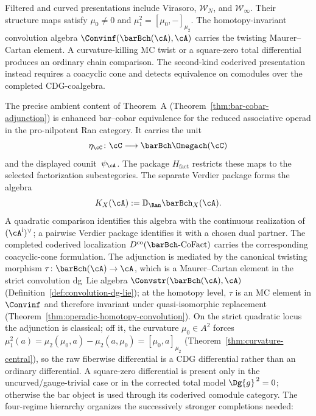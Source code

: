 Filtered and curved presentations include Virasoro,
\(\mathcal W_N\), and \(\mathcal W_\infty\).  Their structure maps
satisfy
\(\mu_0\neq0\) and
\(\mu_1^2=[\mu_0,-]_{\mu_2}\).
The homotopy-invariant convolution algebra
\(\Convinf(\barBch(\cA),\cA)\) carries the twisting
Maurer--Cartan element.  A curvature-killing MC twist or a
square-zero total differential produces an ordinary chain
comparison.  The second-kind coderived presentation instead
requires a coacyclic cone and detects equivalence on comodules over
the completed CDG-coalgebra.

The precise ambient content of Theorem~A
(Theorem~\ref{thm:bar-cobar-adjunction}) is enhanced bar--cobar
equivalence for the reduced associative operad in the pro-nilpotent
Ran category.  It carries the unit
\[
 \eta_\cC\colon\cC\longrightarrow\barBch\Omegach(\cC)
\]
and the displayed counit~\(\psi_\cA\).  The package
\(H_{\mathrm{fact}}\) restricts these maps to the selected
factorization subcategories.  The separate Verdier package forms the
algebra
\[
 K_X(\cA):=\mathbb D_{\Ran}\barBch_X(\cA).
\]
A quadratic comparison identifies this algebra with the continuous
realization of \((\cA^{\mathrm i})^\vee\); a pairwise Verdier package
identifies it with a chosen dual partner.  The completed coderived
localization
\(D^{\co}(\barBch\text{-}\mathrm{CoFact})\)
carries the corresponding coacyclic-cone formulation.
The adjunction is mediated by the canonical twisting morphism
$\tau \colon \barBch(\cA) \to \cA$, which is a Maurer--Cartan
element in the strict convolution dg~Lie algebra
$\Convstr(\barBch(\cA), \cA)$
(Definition~\ref{def:convolution-dg-lie}); at the homotopy level,
$\tau$ is an MC element in $\Convinf$ and therefore invariant under
quasi-isomorphic replacement
(Theorem~\ref{thm:operadic-homotopy-convolution}). On the strict
quadratic locus the adjunction is classical; off it, the
curvature $\mu_0 \in A^2$ forces $\mu_1^2(a) =
\mu_2(\mu_0, a) - \mu_2(a, \mu_0) = [\mu_0, a]_{\mu_2}$
(Theorem~\ref{thm:curvature-central}), so the raw fiberwise
differential is a CDG differential rather than an ordinary
differential. A square-zero differential is present only in the
uncurved/gauge-trivial case or in the corrected total model
$\Dg{g}^{\,2}=0$; otherwise the bar object is used through its
coderived comodule category. The four-regime
hierarchy organizes the successively stronger completions needed:

